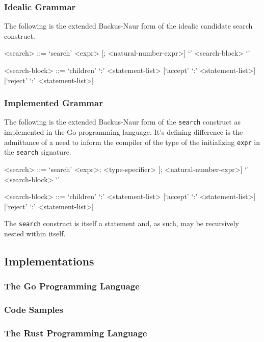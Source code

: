\documentclass[runningheads]{llncs}
\newcommand{\code}[1]{\texttt{#1}}
\begin{document}
\subsubsection{Idealic Grammar}
The following is the extended Backus-Naur form of the idealic candidate search construct.
\begin{grammar}
<search> ::= `search' <expr> [; <natural-number-expr>] `{' <search-block> `}'

<search-block> ::= `children' `:' <statement-list> [`accept' `:' <statement-list>][`reject' `:' <statement-list>]
\end{grammar}

\subsubsection{Implemented Grammar}
The following is the extended Backus-Naur form of the \code{search} construct as implemented in the Go programming language. It's defining difference is the admittance of a need to inform the compiler of the type of the initializing \code{expr} in the \code{search} signature.

\begin{grammar}
<search> ::= `search' <expr>; <type-specifier> [; <natural-number-expr>] `{' <search-block> `}'

<search-block> ::= `children' `:' <statement-list> [`accept' `:' <statement-list>][`reject' `:' <statement-list>]
\end{grammar}

The \code{search} construct is itself a statement and, as such, may be recursively nested within itself.

\subsection{Implementations}

\subsubsection{The Go Programming Language}

\subsubsection{Code Samples}

\subsubsection{The Rust Programming Language}
\end{document}

